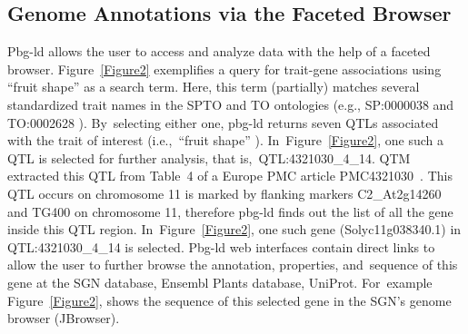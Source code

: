 \documentclass[applsci,article,accept,moreauthors,pdftex]{Definitions/mdpi}
\begin{document}
{\subsection{Genome Annotations via the Faceted Browser}
Pbg-ld allows the user to access and analyze data with the help of a faceted browser. Figure~\ref{Figure2} exemplifies a query for trait-gene associations using “fruit shape” as a search term. Here, this term (partially) matches several standardized trait names in the SPTO and TO ontologies (e.g., SP:0000038 
and TO:0002628 
). By~selecting either one, pbg-ld returns seven QTLs associated with the trait of interest (i.e.,~“fruit shape” ). In~Figure~\ref{Figure2}, one such a QTL is selected for further analysis, that is,~QTL:4321030{\_}4{\_}14. QTM extracted this QTL from Table~4 of a Europe PMC article PMC4321030~\cite{haggard2015multiple}. This QTL occurs on chromosome 11 is marked by flanking markers C2{\_}At2g14260 and TG400 on chromosome 11, therefore pbg-ld finds out the list of all the gene inside this QTL region. In~Figure~\ref{Figure2}, one such gene (Solyc11g038340.1) in QTL:4321030{\_}4{\_}14 is selected. Pbg-ld web interfaces contain direct links to allow the user to further browse the annotation, properties, and~sequence of this gene at the SGN database, Ensembl Plants database, UniProt. For~example Figure~\ref{Figure2}, shows the sequence of this selected gene in the SGN’s genome browser (JBrowser). 
%

}
\end{document}
